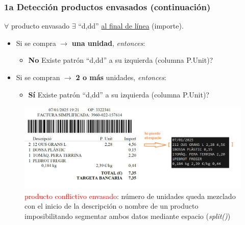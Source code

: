 \documentclass{beamer}
\begin{document}
		\begin{frame}
			\frametitle{1a Detección productos envasados (continuación)}
			
			
			$\forall$ producto envasado $\exists$ ``d,dd'' \underline{al final de línea} (importe).
			
			\begin{itemize}
				\item Si se compra $\rightarrow$ \textbf{una unidad}, \textit{entonces}:
				\begin{itemize}
					\item \textbf{No} Existe patrón ``d,dd'' a su izquierda (columna P.Unit)?
				\end{itemize}
				\item Si se compran $\rightarrow$ \textbf{2 o más} unidades, \textit{entonces}:
				\begin{itemize}
					\item \textbf{Sí} Existe patrón ``d,dd'' a su izquierda (columna P.Unit)?
				\end{itemize}
			\end{itemize}
		\end{frame}
	
	
		\begin{frame}	
			\begin{figure}
				\centering
				\includegraphics[width=1\linewidth]{imgEspecifiques/ticketExtraccioN}
				\caption{\textcolor{red}{producto conflictivo envasado}: número de unidades queda mezclado con el inicio de la descripción o nombre de un producto imposibilitando segmentar ambos datos mediante espacio (\textit{split()})}
				\label{fig:ticketextraccionN}
			\end{figure}
		\end{frame}
		
\end{document}
